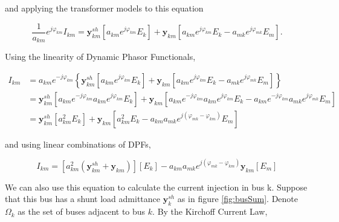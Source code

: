 	\noindent and applying the transformer models to this equation

\begin{equation} \dfrac{1}{a_{km}}e^{j\varphi_{km}} I_{km} = \mathbf{y}_{km}^{sh}\left[ a_{km}e^{j\varphi_{km}}E_k\right] + \mathbf{y}_{km}\left[a_{km}e^{j\varphi_{km}}E_k - a_{mk}e^{j\varphi_{mk}}E_m\right] .\end{equation}

	Using the linearity of Dynamic Phasor Functionals,

\begin{align}
	I_{km} &= a_{km}e^{-j\varphi_{km}} \left\{ \mathbf{y}_{km}^{sh}\left[ a_{km}e^{j\varphi_{km}}E_k\right] + \mathbf{y}_{km}\left[a_{km}e^{j\varphi_{km}}E_k - a_{mk}e^{j\varphi_{mk}}E_m\right]\right\} \nonumber\\[3mm]
	&= \mathbf{y}_{km}^{sh}\left[ a_{km}e^{-j\varphi_{km}} a_{km}e^{j\varphi_{km}}E_k\right] + \mathbf{y}_{km}\left[a_{km}e^{-j\varphi_{km}} a_{km}e^{j\varphi_{km}}E_k - a_{km}e^{-j\varphi_{km}} a_{mk}e^{j\varphi_{mk}}E_m\right] \nonumber\\[3mm]
	&= \mathbf{y}_{km}^{sh}\left[ a_{km}^2 E_k\right] + \mathbf{y}_{km}\left[a_{km}^2 E_k - a_{km}a_{mk}e^{j\left(\varphi_{mk}-\varphi_{km}\right)}E_m\right]
\end{align}

	\noindent and using linear combinations of DPFs,

\begin{equation}
	I_{km} = \left[a_{km}^2\left(\mathbf{y}_{km}^{sh} + \mathbf{y}_{km}\right)\right] \left[ E_k\right] - a_{km}a_{mk}e^{j\left(\varphi_{mk}-\varphi_{km}\right)} \mathbf{y}_{km}\left[E_m\right]
\end{equation}
	
	We can also use this equation to calculate the current injection in bus k. Suppose that this bus has a shunt load admittance $\mathbf{y}^{sh}_k$ as in figure \ref{fig:busSum}. Denote $\Omega_k$ as the set of buses adjacent to bus $k$. By the Kirchoff Current Law,

